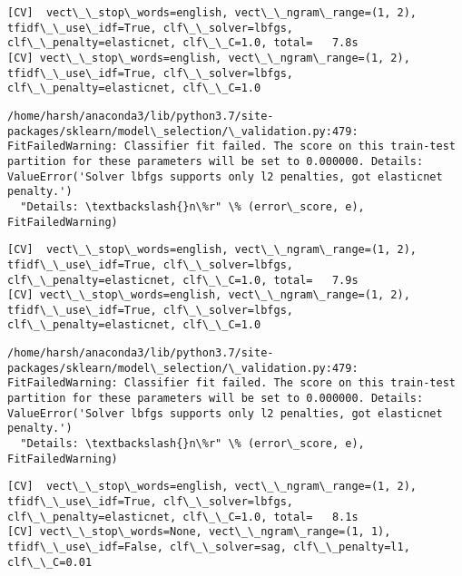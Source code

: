 \documentclass[11pt]{article}
\begin{document}
    \begin{Verbatim}[commandchars=\\\{\}]
[CV]  vect\_\_stop\_words=english, vect\_\_ngram\_range=(1, 2), tfidf\_\_use\_idf=True, clf\_\_solver=lbfgs, clf\_\_penalty=elasticnet, clf\_\_C=1.0, total=   7.8s
[CV] vect\_\_stop\_words=english, vect\_\_ngram\_range=(1, 2), tfidf\_\_use\_idf=True, clf\_\_solver=lbfgs, clf\_\_penalty=elasticnet, clf\_\_C=1.0 

    \end{Verbatim}

    \begin{Verbatim}[commandchars=\\\{\}]
/home/harsh/anaconda3/lib/python3.7/site-packages/sklearn/model\_selection/\_validation.py:479: FitFailedWarning: Classifier fit failed. The score on this train-test partition for these parameters will be set to 0.000000. Details: 
ValueError('Solver lbfgs supports only l2 penalties, got elasticnet penalty.')
  "Details: \textbackslash{}n\%r" \% (error\_score, e), FitFailedWarning)

    \end{Verbatim}

    \begin{Verbatim}[commandchars=\\\{\}]
[CV]  vect\_\_stop\_words=english, vect\_\_ngram\_range=(1, 2), tfidf\_\_use\_idf=True, clf\_\_solver=lbfgs, clf\_\_penalty=elasticnet, clf\_\_C=1.0, total=   7.9s
[CV] vect\_\_stop\_words=english, vect\_\_ngram\_range=(1, 2), tfidf\_\_use\_idf=True, clf\_\_solver=lbfgs, clf\_\_penalty=elasticnet, clf\_\_C=1.0 

    \end{Verbatim}

    \begin{Verbatim}[commandchars=\\\{\}]
/home/harsh/anaconda3/lib/python3.7/site-packages/sklearn/model\_selection/\_validation.py:479: FitFailedWarning: Classifier fit failed. The score on this train-test partition for these parameters will be set to 0.000000. Details: 
ValueError('Solver lbfgs supports only l2 penalties, got elasticnet penalty.')
  "Details: \textbackslash{}n\%r" \% (error\_score, e), FitFailedWarning)

    \end{Verbatim}

    \begin{Verbatim}[commandchars=\\\{\}]
[CV]  vect\_\_stop\_words=english, vect\_\_ngram\_range=(1, 2), tfidf\_\_use\_idf=True, clf\_\_solver=lbfgs, clf\_\_penalty=elasticnet, clf\_\_C=1.0, total=   8.1s
[CV] vect\_\_stop\_words=None, vect\_\_ngram\_range=(1, 1), tfidf\_\_use\_idf=False, clf\_\_solver=sag, clf\_\_penalty=l1, clf\_\_C=0.01 

    \end{Verbatim}
\end{document}
